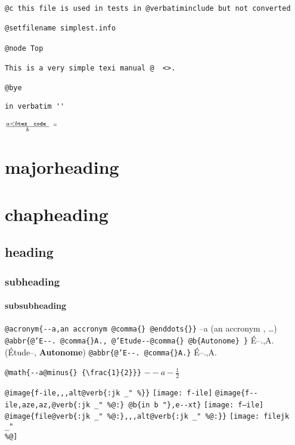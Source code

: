 \documentclass{book}
\newcommand{\GNUTexinfoplaceholder}[1]{}
\newcommand{\GNUTexinfonopagebreakheading}[2]{\let\clearpage\relax \let\cleardoublepage\relax \let\thispagestyle\GNUTexinfoplaceholder #1{#2}}
\renewcommand{\includegraphics}[1]{\fbox{FIG #1}}
\begin{document}
\begin{titlepage}
\begin{verbatim}
@c this file is used in tests in @verbatiminclude but not converted

@setfilename simplest.info

@node Top

This is a very simple texi manual @  <>.

@bye
\end{verbatim}

\begin{verbatim}
in verbatim ''
\end{verbatim}





$\frac{a < b \texttt{tex \hbox{ code }}}{b}$ ``

\GNUTexinfonopagebreakheading{\chapter*}{majorheading}

\GNUTexinfonopagebreakheading{\chapter*}{chapheading}

\GNUTexinfonopagebreakheading{\section*}{heading}

\GNUTexinfonopagebreakheading{\subsection*}{subheading}

\GNUTexinfonopagebreakheading{\subsubsection*}{subsubheading}


\texttt{@acronym\{{-}{-}a,an accronym @comma\{\} @enddots\{\}\}} --a (an accronym , \dots{})
\texttt{@abbr\{@'E{-}{-}. @comma\{\}A., @'Etude{-}{-}@comma\{\} @b\{Autonome\} \}} \'{E}--.\@ ,A.\@ (\'{E}tude--, \textbf{Autonome})
\texttt{@abbr\{@'E{-}{-}. @comma\{\}A.\}} \'{E}--.\@ ,A.\@

\texttt{@math\{{-}{-}a@minus\{\} \{\textbackslash{}frac\{1\}\{2\}\}\}} $--a- {\frac{1}{2}}$

\texttt{@image\{f-ile,,,alt@verb\{:jk \_" \%\@\}\}} \texttt{[image: f-ile]}
\texttt{@image\{f{-}{-}ile,aze,az,@verb\{:jk \_" \%@:\} @b\{in b "\},e{-}{-}xt\}} \texttt{[image: f--ile]}
\texttt{@image\{file@verb\{:jk \_" \%@:\},,,alt@verb\{:jk \_" \%@:\}\}} \texttt{[image: filejk \\\_" \\\%@]}





\end{titlepage}
\end{document}
